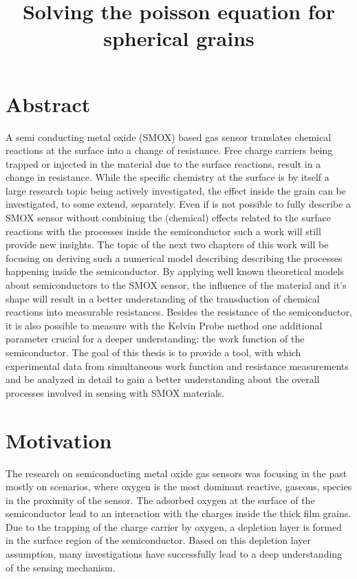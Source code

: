 \documentclass[11pt]{article}
\title{Solving the poisson equation for spherical grains}
\begin{document}
    
    \maketitle
    
    

    
    \setcounter{page}{15}
\tableofcontents 
\setcounter{section}{0}

    \hypertarget{abstract}{%
\section{Abstract}\label{abstract}}

A semi conducting metal oxide (SMOX) based gas sensor translates
chemical reactions at the surface into a change of resistance. Free
charge carriers being trapped or injected in the material due to the
surface reactions, result in a change in resistance. While the specific
chemistry at the surface is by itself a large research topic being
actively investigated, the effect inside the grain can be investigated,
to some extend, separately. Even if is not possible to fully describe a
SMOX sensor without combining the (chemical) effects related to the
surface reactions with the processes inside the semiconductor such a
work will still provide new insights. The topic of the next two chapters
of this work will be focusing on deriving such a numerical model
describing describing the processes happening inside the semiconductor.
By applying well known theoretical models about semiconductors to the
SMOX sensor, the influence of the material and it's shape will result in
a better understanding of the transduction of chemical reactions into
measurable resistances. Besides the resistance of the semiconductor, it
is also possible to measure with the Kelvin Probe method one additional
parameter crucial for a deeper understanding: the work function of the
semiconductor. The goal of this thesis is to provide a tool, with which
experimental data from simultaneous work function and resistance
measurements and be analyzed in detail to gain a better understanding
about the overall processes involved in sensing with SMOX materials.

    \hypertarget{motivation}{%
\section{Motivation}\label{motivation}}

The research on semiconducting metal oxide gas sensors was focusing in
the past mostly on scenarios, where oxygen is the most dominant
reactive, gaseous, species in the proximity of the sensor. The adsorbed
oxygen at the surface of the semiconductor lead to an interaction with
the charges inside the thick film grains. Due to the trapping of the
charge carrier by oxygen, a depletion layer is formed in the surface
region of the semiconductor. Based on this depletion layer assumption,
many investigations have successfully lead to a deep understanding of
the sensing mechanism.
\end{document}
